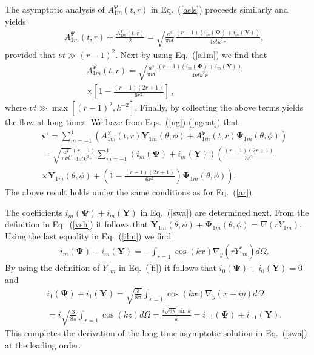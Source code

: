 \documentclass[aps,prx,twocolumn,amsmath,amssymb,amsfonts]{revtex4-2}
\begin{document}
The asymptotic analysis of $A_{1m}^{\Psi}(t, r)$ in Eq.~(\ref{asls}) proceeds similarly and yields
\begin{eqnarray}&&
A_{1m}^{\Psi}(t, r)+\frac{A_{1m}^{Y}(t, r)}{2}\!=\!\sqrt{\frac{a^2}{\pi \nu t}}\frac{(r\!-\!1)(i_{m}(\bm \Psi) \!+\! i_{m}(\bm Y))}{4\nu t k^2 r},\nonumber
\end{eqnarray}
provided that $\nu t\!\gg\!(r-1)^2$. Next by using Eq.~(\ref{a1m}) we find that
\begin{eqnarray}&&
A_{1m}^{\Psi}(t, r)\!=\!\sqrt{\frac{a^2}{\pi \nu t}}\frac{(r\!-\!1)(i_{m}(\bm \Psi) \!+\! i_{m}(\bm Y))}{4\nu t k^2 r}
\label{ar}\\&&
\times\left[1-\frac{(r\!-\!1)(2r\!+\!1)}{6r^2}\right]\,, \nonumber
\end{eqnarray}
where $\nu t\gg \max{[(r-1)^2,  k^{-2}]}$. Finally, by collecting the above terms yields the flow at long times. We have from Eqs.~(\ref{ug})-(\ref{ugent}) that
\begin{eqnarray}&&
\bm v'\!= \!\sum_{m=-1}^1\left( A_{1m}^{Y}(t, r)\bm Y_{1m}(\theta, \phi)\!+\!A_{1m}^{\Psi}(t, r)\bm \Psi_{1m}(\theta, \phi) \right)\nonumber\\&&
=\sqrt{\frac{a^2}{\pi \nu t}}\frac{(r\!-\!1)}{4\nu t k^2 r}\sum_{m=-1}^1\left(i_m(\bm \Psi) \!+\! i_m(\bm Y)\right)\left(\frac{(r\!-\!1)(2r\!+\!1)}{3 r^2}
\right.\nonumber\\&&\left.
\times\bm Y_{1m}(\theta, \phi)+\left(1-\frac{(r\!-\!1)(2r\!+\!1)}{6r^2}\right)\bm \Psi_{1m}(\theta, \phi) \right).\label{swa}
\end{eqnarray}
The above result holds under the same conditions as for Eq.~(\ref{ar}).

The coefficients $i_m(\bm \Psi) \!+\! i_m(\bm Y)$ in Eq.~(\ref{swa}) are determined next. From the definition in Eq.~(\ref{vsh}) it follows that $\bm Y_{1m}(\theta, \phi)+\bm \Psi_{1m}(\theta, \phi)=\nabla(rY_{1m})$. Using the last equality in Eq.~(\ref{ilm}) we find
\begin{eqnarray}&&\!\!\!\!\!\!
i_m(\bm \Psi) \!+\! i_m(\bm Y)=-\int_{r=1} \cos(kx) \nabla_y(rY^*_{1m}) d\Omega.
\end{eqnarray}
By using the definition of $Y_{1m}$ in Eq.~(\ref{fi}) it follows that $i_0(\bm \Psi) \!+\! i_0(\bm Y)=0$ and
\begin{eqnarray}&&
i_1(\bm \Psi) \!+\! i_1(\bm Y)=\sqrt{\frac{3}{8\pi}}\int_{r=1} \cos(kx) \nabla_y(x+iy) d\Omega
\\&&
=i\sqrt{\frac{3}{8\pi}}\int_{r=1}\!\! \cos(kz) d\Omega%
\!=\!\frac{i \sqrt{6\pi} \sin k}{k}\!=\!i_{-1}(\bm \Psi)\!+\! i_{-1}(\bm Y).\nonumber
\end{eqnarray}
This completes the derivation of the long-time asymptotic solution in Eq.~(\ref{swa}) at the leading order.
\end{document}

